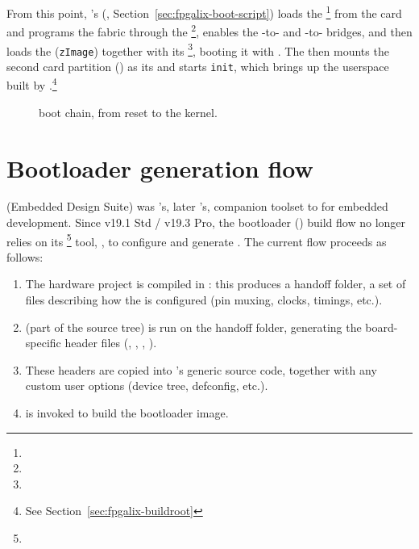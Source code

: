 From this point, 's  (, Section~\ref{sec:fpgalix-boot-script}) loads the \footnote{} from the  card and programs the  fabric through the  \footnote{}, enables the -to- and -to- bridges, and then loads the   (\texttt{zImage}) together with its \footnote{}, booting it with . The  then mounts the second  card partition () as its  and starts \texttt{init}, which brings up the userspace built by .\footnote{See Section~\ref{sec:fpgalix-buildroot}}

\begin{figure}[htbp]
    \centering
    
    \caption{ boot chain, from reset to the  kernel.}
    \label{fig:fpgalix-boot-chain}
\end{figure}

\section{Bootloader generation flow}
\label{sec:fpgalix-bootloader-flow}

 (Embedded Design Suite) was 's, later 's, companion toolset to  for   embedded development. Since  v19.1 Std / v19.3 Pro, the bootloader () build flow no longer relies on its \footnote{} tool, , to configure and generate . The current flow proceeds as follows:

\begin{enumerate}
    \item The hardware project is compiled in : this produces a handoff folder, a set of  files describing how the  is configured (pin muxing, clocks,  timings, etc.).
    \item {} \cite{MACNICA-BOOT} (part of the  source tree) is run on the handoff folder, generating the board-specific header files (, , , ).
    \item These headers are copied into 's generic source code, together with any custom user options (device tree, defconfig, etc.).
    \item {} is invoked to build the bootloader image.
\end{enumerate}


